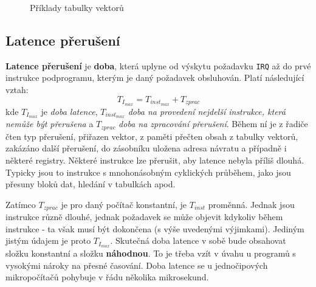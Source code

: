       \begin{figure}[ht!]
        \centering  
          {}
          {} 
        \caption{Příklady tabulky vektorů}
        \label{MIT:fig_sbernice2627}
      \end{figure}
      
    \subsection{Latence přerušení}
      \textbf{Latence přerušení} je \textbf{doba}, která uplyne od výskytu požadavku \texttt{IRQ} 
      až do prvé instrukce podprogramu, kterým je daný požadavek obsluhován. Platí následující 
      vztah:
      \begin{equation}
        T_{I_{max}} = T_{inst_{max}} + T_{zprac}
      \end{equation}
      kde \(T_{I_{max}}\) je \emph{doba latence}, \(T_{inst_{max}}\) \emph{doba na provedení 
      nejdelší instrukce, která nemůže být přerušena} a \(T_{zprac}\) \emph{doba na zpracování 
      přerušení}. Během ní je z řadiče čten typ přerušení, přiřazen vektor, z paměti přečten obsah 
      z tabulky vektorů, zakázáno další přerušení, do zásobníku uložena adresa návratu a případně i 
      některé registry. Některé instrukce lze přerušit, aby latence nebyla příliš dlouhá. Typicky 
      jsou to instrukce s mnohonásobným cyklických průběhem, jako jsou přesuny bloků dat, hledání v 
      tabulkách apod.
      
      Zatímco \(T_{zprac}\) je pro daný počítač konstantní, je \(T_{inst}\) proměnná. Jednak jsou 
      instrukce různě dlouhé, jednak požadavek se může objevit kdykoliv během instrukce - ta však 
      musí být dokončena (s výše uvedenými výjimkami). Jediným jistým údajem je proto 
      \(T_{I_{max}}\). Skutečná doba latence v sobě bude obsahovat složku konstantní a složku 
      \textbf{náhodnou}. To je třeba vzít v úvahu u programů s vysokými nároky na přesné časování. 
      Doba latence se u jednočipových mikropočítačů pohybuje v řádu několika mikrosekund.
      
